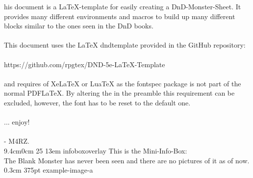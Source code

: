 \documentclass[letterpaper,openany,oneside,twocolumn]{book}
\begin{document}

\mainmatter%



\entryfont \noindent {}his document is a LaTeX-template for easily creating a DnD-Monster-Sheet. It provides many different environments and macros to build up many different blocks similar to the ones seen in the DnD books.\\\\
This document uses the LaTeX dnd\textunderscore template provided in the GitHub repository:\\\\ https://github.com/rpgtex/DND-5e-LaTeX-Template\\\\ and requires of XeLaTeX or LuaTeX as the fontspec package is not part of the normal PDFLaTeX. By altering the \entryfont in the preamble this requirement can be excluded, however, the font has to be reset to the default one. \\\\
... enjoy!\\\\
- M4RZ.\\

\MonsterGraphicAndShortInfo%
	{9.4cm}{0cm}%
	{25}%
	{13em}%
	{infoboxoverlay} %
	{This is the Mini-Info-Box:\\The Blank Monster has never been seen and there are no pictures of it as of now.}%
	{0.3cm}%
	{375pt}%
	{example-image-a}%
\end{document}
